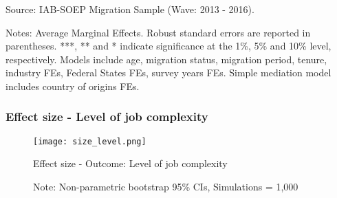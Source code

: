 \documentclass{beamer}
\begin{document}
\begin{frame}
\begin{table}[htbp]
 \begin{tablenotes}
      \tiny
      \item Source: IAB-SOEP Migration Sample (Wave: 2013 - 2016).
      \item Notes: Average Marginal Effects. Robust standard errors are reported in parentheses.  ***, ** and * indicate significance at the 1\%, 5\% and 10\% level, respectively. Models include age, migration status, migration period, tenure, industry FEs, Federal States FEs, survey years FEs. Simple mediation model includes country of origins FEs.
   
 \end{tablenotes}

\end{table}%

\end{frame}


\begin{frame}
\frametitle{Effect size - Level of job complexity}

\begin{figure}
\centering
\texttt{[image: size\_level.png]}
  \caption{Effect size - Outcome: Level of job complexity}
\caption*{\small{Note: Non-parametric bootstrap 95\% CIs, Simulations = 1,000}}
\end{figure}
\end{frame}
\end{document}
